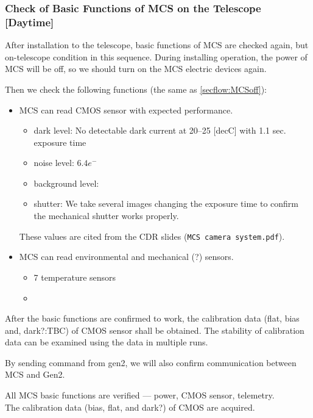 \subsubsection{Check of Basic Functions of MCS on the Telescope [Daytime]}\label{secflow:MCSon}


After installation to the telescope, basic functions of MCS are checked again, but on-telescope condition in this sequence.
During installing operation, the power of MCS will be off, so we should turn on the MCS electric devices again.

Then we check the following functions (the same as \ref{secflow:MCSoff}):

\begin{itemize}
\item MCS can read CMOS sensor with expected performance.
	\begin{itemize}
	\item dark level: No detectable dark current at 20--25 [decC] with 1.1 sec. exposure time
	\item noise level: $6.4 e^-$
	\item background level: 
	\item shutter: We take several images changing the exposure time to confirm the mechanical shutter works properly.
	\end{itemize}
These values are cited from the CDR slides ({\tt MCS camera system.pdf}).
\item MCS can read environmental and mechanical (?) sensors.
	\begin{itemize}
	\item 7 temperature sensors 
	\item {}
	\end{itemize}
\end{itemize}

After the basic functions are confirmed to work, the calibration data (flat, bias and, dark?:TBC) of CMOS sensor shall be obtained.
The stability of calibration data can be examined using the data in multiple runs.

By sending command from gen2, we will also confirm communication between MCS and Gen2.


\begin{itembox}[l]{}
All MCS basic functions are verified --- power, CMOS sensor, telemetry.  \\
The calibration data (bias, flat, and dark?) of CMOS are acquired.

\end{itembox}

